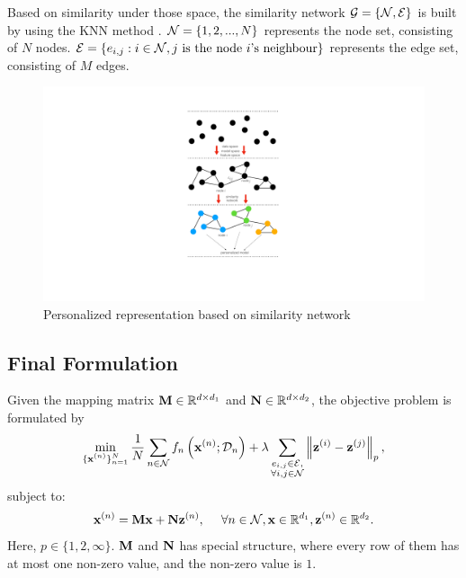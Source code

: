 \documentclass[journal]{IEEEtran}
\begin{document}
Based on similarity under those space, the similarity network ${\mathcal{G}} = \{{\mathcal{N}}, {\mathcal{E}}\}$ is built by using the KNN method \cite{dd}. ${\mathcal{N}}=\{1,2, ..., N\}$ represents the node set, consisting of $N$ nodes. ${\mathcal{E}}=\{e_{i,j} : i\in{\mathcal{N}}, j {~} \text{is the node $i$'s neighbour}\}$ represents the edge set, consisting of $M$ edges. 

\begin{figure}[!t]
\setlength{\abovecaptionskip}{0pt}
\setlength{\belowcaptionskip}{0pt}
\centering 
\includegraphics[width=0.97\columnwidth]{figs/figs_networkG}
\caption{Personalized representation based on similarity network}
\label{figure_xxx}
\end{figure}



\subsection{Final Formulation}
Given the mapping matrix ${\bf M}\in\mathbb{R}^{d\times d_1}$ and ${\bf N}\in\mathbb{R}^{d\times d_2}$, the objective problem is formulated by
\begin{align}
\min_{\substack{\{{\bf x}^{(n)}\}_{n=1}^N}} \frac{1}{N}\sum_{n\in{\mathcal{N}}} f_n\left( {\bf x}^{(n)}; \mathcal{D}_n \right) + \lambda \sum_{\substack{e_{i,j} \in {\mathcal{E}},\\ \forall i,j\in{\mathcal{N}}}} \left\lVert{\bf z}^{(i)} - {\bf z}^{(j)}\right\rVert_p,
\end{align} subject to:
\begin{align}
{\bf x}^{(n)} = {\bf M}{\bf x} + {\bf N} {\bf z}^{(n)},{~~~~}\forall n\in{\mathcal{N}}, {\bf x}\in\mathbb{R}^{d_1}, {\bf z}^{(n)}\in\mathbb{R}^{d_2}.
\end{align} Here, $p\in\{1,2,\infty\}$. ${\bf M}$ and ${\bf N}$ has special structure, where every row of them has at most one non-zero value, and the non-zero value is $1$.  
\end{document}
